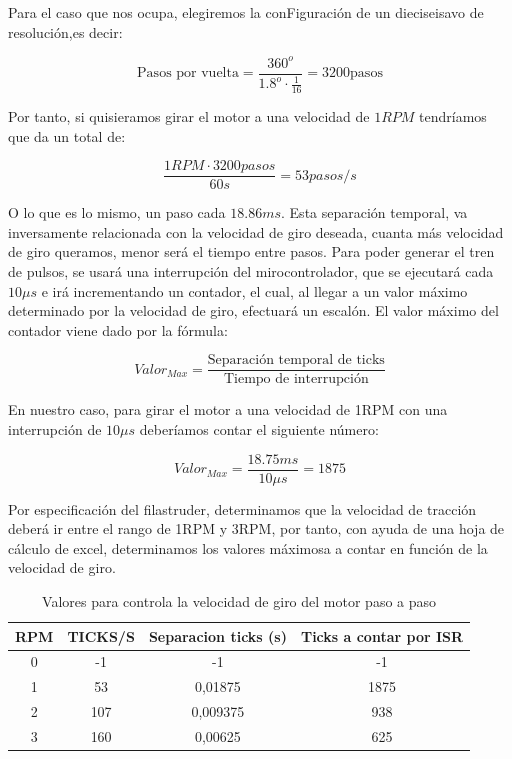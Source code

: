 Para el caso que nos ocupa, elegiremos la conFiguración de un dieciseisavo de resolución,es decir:

$$ \text{Pasos por vuelta} = \frac{360^o}{1.8^o \cdot \frac{1}{16} } = 3200 \text{pasos}  $$

Por tanto, si quisieramos girar el motor a una velocidad de $1RPM$ tendríamos que da un total de:

$$\frac{1 RPM \cdot 3200 pasos}{60 s} = 53 pasos/s$$

O lo que es lo mismo, un paso cada $18.86 ms$. Esta separación temporal, va inversamente relacionada con la velocidad de giro deseada, cuanta más velocidad de giro queramos, menor será el tiempo entre pasos. Para poder generar el tren de pulsos, se usará una interrupción del mirocontrolador, que se ejecutará cada $10\mu s$ e irá incrementando un contador, el cual, al llegar a un valor máximo determinado por la velocidad de giro, efectuará un escalón. El valor máximo del contador viene dado por la fórmula:

$$ Valor_{Max} = \frac{\text{Separación temporal de ticks}}{\text{Tiempo de interrupción}}$$

En nuestro caso, para girar el motor a una velocidad de 1RPM con una interrupción de $10\mu s$ deberíamos contar el siguiente número:

$$Valor_{Max} = \frac{18.75 ms}{10\mu s} = 1875$$

Por especificación del filastruder, determinamos que la velocidad de tracción deberá ir entre el rango de 1RPM y 3RPM, por tanto, con ayuda de una hoja de cálculo de excel, determinamos los valores máximosa a contar en función de la velocidad de giro.

\begin{table}[H]
    \centering
    \begin{tabular}{cccc}
        \multicolumn{1}{l}{{\bf RPM}} & \multicolumn{1}{l}{{\bf TICKS/S}} & \multicolumn{1}{l}{{\bf Separacion ticks (s)}} & \multicolumn{1}{l}{{\bf Ticks a contar por ISR}} \\
        \hline
        0 & -1 & -1 & -1 \\
        1 & 53 & 0,01875 & 1875 \\
        2 & 107 & 0,009375 & 938 \\
        3 & 160 & 0,00625 & 625
    \end{tabular}
    \caption{Valores para controla la velocidad de giro del motor paso a paso}
    \label{tab:valores_paso_paso}
\end{table}

